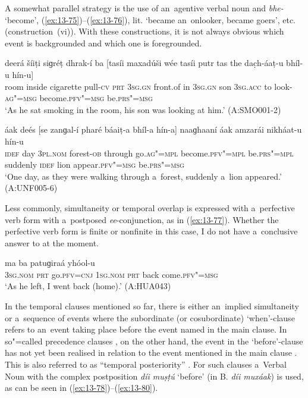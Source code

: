 A somewhat parallel strategy is the use of an~agentive verbal noun and \textit{bhe-} `become', (\ref{ex:13-75})--(\ref{ex:13-76}), lit. `became an~onlooker, became goers', etc. (construction~(vi)). With these constructions, it is not always obvious which event is backgrounded and which one is foregrounded. 

\begin{exe}
\ex
\label{ex:13-75}
\gll deerá šíiṭi siɡréṭ dhrak-í ba [tasíi maxadúši wée tasíi putr tas the dac̣h-áaṭ-u bhíl-u hín-u] \\
room inside cigarette pull-\textsc{cv} \textsc{prt} \textsc{3sg.gn} front.of in \textsc{3sg.gn}  son \textsc{3sg.acc} to look-\textsc{ag"=msg} become.\textsc{pfv"=msg} be.\textsc{prs"=msg}  \\
\glt `As he sat smoking in the room, his son was looking at him.' (A:SMO001-2)

\ex
\label{ex:13-76}
\gll áak deés [se zanɡal-í pharé báaiṭ-a bhíl-a hín-a] naaɡhaaní áak amzarái nikháat-u hín-u \\
\textsc{idef} day \textsc{3pl.nom} forest-\textsc{ob} through go.\textsc{ag"=mpl}  become.\textsc{pfv"=mpl} be.\textsc{prs"=mpl} suddenly \textsc{idef} lion appear.\textsc{pfv"=msg} be.\textsc{prs"=msg}  \\
\glt `One day, as they were walking through a~forest, suddenly a~lion appeared.' (A:UNF005-6) 
\end{exe}

Less commonly, simultaneity or temporal overlap is expressed with a~perfective verb form with a~postposed \textit{ee}-conjunction, as in (\ref{ex:13-77}). Whether the perfective verb form is finite or nonfinite in this case, I do not have a~conclusive answer to at the moment.

\begin{exe}
\ex
\label{ex:13-77}
\gll [so ta ɡúum=ee] ma ba patuɡiraá yhóol-u \\
\textsc{3sg.nom} \textsc{prt} go.\textsc{pfv=cnj} \textsc{1sg.nom} \textsc{prt} back  come.\textsc{pfv"=msg} \\
\glt `As he left, I went back (home).' (A:HUA043) 
\end{exe}

 In the temporal clauses mentioned so far, there is either an~implied simultaneity or a~sequence of events where the subordinate (or cosubordinate) `when'-clause refers to an~event taking place before the event named in the main clause. In so"=called precedence clauses \citep[327]{givon2001b}, on the other hand, the event in the `before'-clause has not yet been realised in relation to the event mentioned in the main clause \citep[247--248]{thompsonetal2007}. This is also referred to as ``temporal posteriority'' \citep[159]{cristofaro2005}. For such clauses a~Verbal Noun with the complex postposition \textit{díi muṣṭú} `before' (in B. \textit{díi muxáak}) is used, as can be seen in (\ref{ex:13-78})--(\ref{ex:13-80}).

